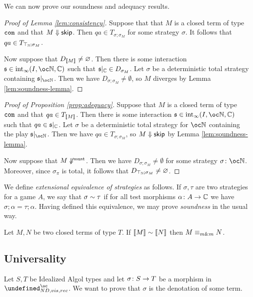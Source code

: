 \documentclass[sigplan,10pt,review]{acmart}\settopmatter{printfolios=true,printccs=false,printacmref=false}
\let\G\undefined
\begin{document}
We can now prove our soundness and adequacy results.

\begin{proof}[Proof of Lemma \ref{lem:consistency}]
  Suppose that that $M$ is a closed term of type ${\mathtt{com}}$ and that $M\Downarrow{\mathsf{skip}}$.  
  Then $qa\in T_{\sigma;\sigma_M}$ for some strategy $\sigma$.  
  It follows that $qa\in T_{\top_{\mathbb{N}};\sigma_M}$.

  Now suppose that $D_{\left\llbracket M\right\rrbracket}\neq\varnothing$.  
  Then there is some interaction $\s\in\Int_\infty(I,\oc\bN,\bC)$ such that $\mathfrak s\vert_{\mathbb{C}}\in D_{\sigma_M}$.
  Let $\sigma$ be a deterministic total strategy containing $\s\vert_{\oc\bN}$.  
  Then we have $D_{\sigma;\sigma_M}\ne\emptyset$, so $M$ diverges by Lemma \ref{lem:soundness-lemma}.
\end{proof}

\begin{proof}[Proof of Proposition \ref{prop:adequacy}]
  Suppose that $M$ is a closed term of type ${\mathtt{com}}$ and that $qa\in T_{\left\llbracket M\right\rrbracket}$.  
  Then there is some interaction $\s\in\Int_\infty(I,\oc\bN,\bC)$ such that $qa\in\mathfrak s\vert_{\mathbb{C}}$.  
  Let $\sigma$ be a deterministic total strategy for $\oc\bN$ containing the play $\s\vert_{\oc\bN}$.  
  Then we have $qa\in T_{\sigma;\sigma_M}$, so $M\Downarrow{\mathsf{skip}}$ by Lemma \ref{lem:soundness-lemma}.

  Now suppose that $M\not\Downarrow^{\text{must}}$.  
  Then we have $D_{\sigma;\sigma_M}\ne\emptyset$ for some strategy $\sigma\from\oc\bN$.
  Moreover, since $\sigma_\pi$ is total, it follows that $D_{\top_{\mathbb{N}};\sigma_M}\ne\varnothing$.
\end{proof}

We define \emph{extensional equivalence of strategies} as follows.  
If $\sigma,\tau$ are two strategies for a game $A$, we say that $\sigma\sim\tau$ if for all test morphisms $\alpha\colon A \to \mathbb{C}$ we have $\sigma;\alpha=\tau;\alpha$.  
Having defined this equivalence, we may prove \emph{soundness} in the usual way.

\begin{theorem}[Soundness]
  Let $M,N$ be two closed terms of type $T$.  
  If $\left\llbracket M\right\rrbracket\sim\left\llbracket N\right\rrbracket$ then $M\equiv_{m\&m} N$.  
\end{theorem}

\subsection{Universality}

Let $S,T$ be Idealized Algol types and let $\sigma\colon S\to T$ be a morphism in $\G_{ND,vis,rec}^\oc$.  
We want to prove that $\sigma$ is the denotation of some term.  
\end{document}
